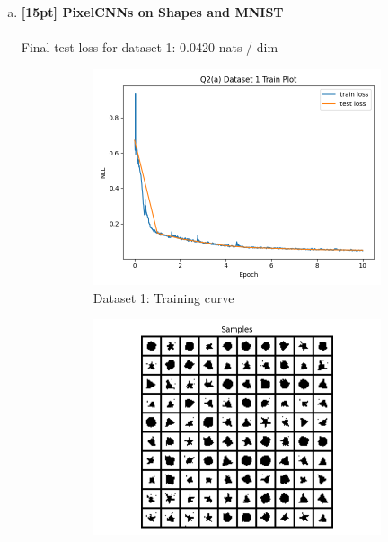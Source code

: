 \documentclass{article}
\begin{document}
\newpage
{}

\begin{enumerate}[(a)]
\item {\bf [15pt] PixelCNNs on Shapes and MNIST} \\\\
Final test loss for dataset 1: 0.0420  nats / dim
\begin{figure}[H]
    \centering
    \begin{subfigure}{0.45\textwidth}
        \centering
        \includegraphics[width=\textwidth]{figures/q2_a_dset1_train_plot.png}
        \caption{Dataset 1: Training curve}
    \end{subfigure}
    \hspace{0.2in}
    \begin{subfigure}{0.45\textwidth}
        \centering
        \includegraphics[width=\textwidth]{figures/q2_a_dset1_samples.png}

\end{subfigure}
\end{figure}
\end{enumerate}
\end{document}
